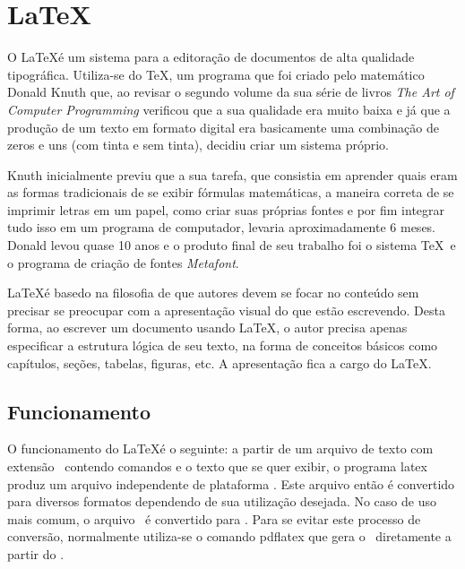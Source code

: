 \section{\LaTeX}
O \LaTeX é um sistema para a editoração de documentos de alta qualidade tipográfica. Utiliza-se do \TeX, um programa que foi criado pelo matemático Donald Knuth que, ao revisar o segundo volume da sua série de livros {\slshape The Art of Computer Programming} verificou que a sua qualidade era muito baixa e já que a produção de um texto em formato digital era basicamente uma combinação de zeros e uns (com tinta e sem tinta), decidiu criar um sistema próprio.

Knuth inicialmente previu que a sua tarefa, que consistia em aprender quais eram as formas tradicionais de se exibir fórmulas matemáticas, a maneira correta de se imprimir letras em um papel, como criar suas próprias fontes e por fim integrar tudo isso em um programa de computador, levaria aproximadamente 6 meses. Donald levou quase 10 anos e o produto final de seu trabalho foi o sistema \TeX \ e o programa de criação de fontes \textit{Metafont}.

\LaTeX é basedo na filosofia de que autores devem se focar no conteúdo sem precisar se preocupar com a apresentação visual do que estão escrevendo. Desta forma, ao escrever um documento usando \LaTeX, o autor precisa apenas especificar a estrutura lógica de seu texto, na forma de conceitos básicos como capítulos, seções, tabelas, figuras, etc. A apresentação fica a cargo do \LaTeX.


\subsection{Funcionamento}

O funcionamento do \LaTeX é o seguinte: a partir de um arquivo de texto com extensão \tex\ contendo comandos e o texto que se quer exibir, o programa \textsf{latex} produz um arquivo independente de plataforma \dvi. Este arquivo então é convertido para diversos formatos dependendo de sua utilização desejada. No caso de uso mais comum, o arquivo \dvi\ é convertido para \pdf. Para se evitar este processo de conversão, normalmente utiliza-se o comando \textsf{pdflatex} que gera o \pdf\ diretamente a partir do \tex.

